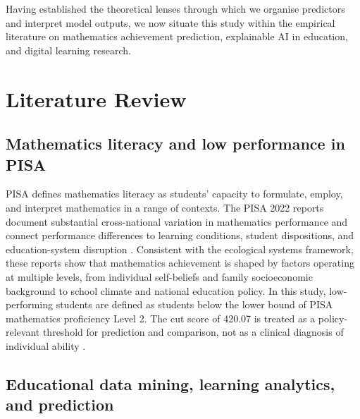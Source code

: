\documentclass[pdflatex,sn-mathphys-ay]{sn-jnl}
\begin{document}
Having established the theoretical lenses through which we organise predictors and interpret model outputs, we now situate this study within the empirical literature on mathematics achievement prediction, explainable AI in education, and digital learning research.

\section{Literature Review}

\FloatBarrier
\subsection{Mathematics literacy and low performance in PISA}

PISA defines mathematics literacy as students' capacity to formulate, employ, and interpret mathematics in a range of contexts. The PISA 2022 reports document substantial cross-national variation in mathematics performance and connect performance differences to learning conditions, student dispositions, and education-system disruption \citep{OECD_2022_results_vol1,OECD_2022_results_vol5}. Consistent with the ecological systems framework, these reports show that mathematics achievement is shaped by factors operating at multiple levels, from individual self-beliefs and family socioeconomic background to school climate and national education policy. In this study, low-performing students are defined as students below the lower bound of PISA mathematics proficiency Level 2. The cut score of 420.07 is treated as a policy-relevant threshold for prediction and comparison, not as a clinical diagnosis of individual ability \citep{NCES_2022_cut_scores}.

\FloatBarrier
\subsection{Educational data mining, learning analytics, and prediction}
\end{document}
